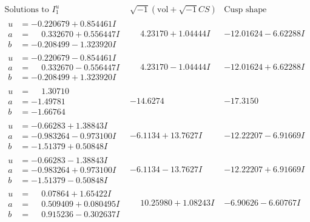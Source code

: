 \documentclass[1p]{elsarticle_modified}
\theoremstyle{definition}
\newcommand{\I}{\sqrt{-1}}
\begin{document}
$$\begin{array}{c|c|c}  
\text{Solutions to }I^u_{1}& \I (\text{vol} + \sqrt{-1}CS) & \text{Cusp shape}\\
 \hline 
\begin{aligned}
u &= -0.220679 + 0.854461 I \\
a &= \phantom{-}0.332670 + 0.556447 I \\
b &= -0.208499 - 1.323920 I\end{aligned}
 & \phantom{-}4.23170 + 1.04444 I & -12.01624 - 6.62288 I \\ \hline\begin{aligned}
u &= -0.220679 - 0.854461 I \\
a &= \phantom{-}0.332670 - 0.556447 I \\
b &= -0.208499 + 1.323920 I\end{aligned}
 & \phantom{-}4.23170 - 1.04444 I & -12.01624 + 6.62288 I \\ \hline\begin{aligned}
u &= \phantom{-}1.30710\phantom{ +0.000000I} \\
a &= -1.49781\phantom{ +0.000000I} \\
b &= -1.66764\phantom{ +0.000000I}\end{aligned}
 & -14.6274\phantom{ +0.000000I} & -17.3150\phantom{ +0.000000I} \\ \hline\begin{aligned}
u &= -0.66283 + 1.38843 I \\
a &= -0.983264 - 0.973100 I \\
b &= -1.51379 + 0.50848 I\end{aligned}
 & -6.1134 + 13.7627 I & -12.22207 - 6.91669 I \\ \hline\begin{aligned}
u &= -0.66283 - 1.38843 I \\
a &= -0.983264 + 0.973100 I \\
b &= -1.51379 - 0.50848 I\end{aligned}
 & -6.1134 - 13.7627 I & -12.22207 + 6.91669 I \\ \hline\begin{aligned}
u &= \phantom{-}0.07864 + 1.65422 I \\
a &= \phantom{-}0.509409 + 0.080495 I \\
b &= \phantom{-}0.915236 - 0.302637 I\end{aligned}
 & \phantom{-}10.25980 + 1.08243 I & -6.90626 - 6.60767 I \\ \hline\begin{aligned}

\end{aligned}
\end{array}$$
\end{document}
